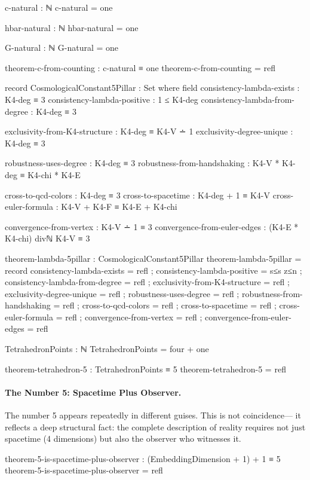 \documentclass[11pt,a4paper]{book}
\begin{document}
\begin{code}
c-natural : ℕ
c-natural = one

hbar-natural : ℕ
hbar-natural = one

G-natural : ℕ
G-natural = one

theorem-c-from-counting : c-natural ≡ one
theorem-c-from-counting = refl

record CosmologicalConstant5Pillar : Set where
  field
    consistency-lambda-exists : K4-deg ≡ 3
    consistency-lambda-positive : 1 ≤ K4-deg
    consistency-lambda-from-degree : K4-deg ≡ 3
    
    exclusivity-from-K4-structure : K4-deg ≡ K4-V ∸ 1
    exclusivity-degree-unique : K4-deg ≡ 3
    
    robustness-uses-degree : K4-deg ≡ 3
    robustness-from-handshaking : K4-V * K4-deg ≡ K4-chi * K4-E
    
    cross-to-qcd-colors : K4-deg ≡ 3
    cross-to-spacetime : K4-deg + 1 ≡ K4-V
    cross-euler-formula : K4-V + K4-F ≡ K4-E + K4-chi
    
    convergence-from-vertex : K4-V ∸ 1 ≡ 3
    convergence-from-euler-edges : (K4-E * K4-chi) divℕ K4-V ≡ 3

theorem-lambda-5pillar : CosmologicalConstant5Pillar
theorem-lambda-5pillar = record
  { consistency-lambda-exists = refl
  ; consistency-lambda-positive = s≤s z≤n
  ; consistency-lambda-from-degree = refl
  ; exclusivity-from-K4-structure = refl
  ; exclusivity-degree-unique = refl
  ; robustness-uses-degree = refl
  ; robustness-from-handshaking = refl
  ; cross-to-qcd-colors = refl
  ; cross-to-spacetime = refl
  ; cross-euler-formula = refl
  ; convergence-from-vertex = refl
  ; convergence-from-euler-edges = refl
  }

TetrahedronPoints : ℕ
TetrahedronPoints = four + one

theorem-tetrahedron-5 : TetrahedronPoints ≡ 5
theorem-tetrahedron-5 = refl
\end{code}

\paragraph{The Number 5: Spacetime Plus Observer.}

The number 5 appears repeatedly in different guises. This is not coincidence—
it reflects a deep structural fact: the complete description of reality 
requires not just spacetime (4 dimensions) but also the observer who 
witnesses it.

\begin{code}
theorem-5-is-spacetime-plus-observer : (EmbeddingDimension + 1) + 1 ≡ 5
theorem-5-is-spacetime-plus-observer = refl
\end{code}
\end{document}
